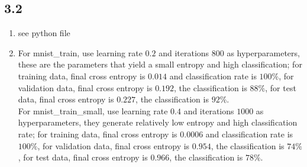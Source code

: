 \documentclass[12pt]{article}
\begin{document}
	\subsection*{3.2}
	\begin{enumerate}[label=\alph*)]
		\item see python file
		\item For mnist\_train, use learning rate $0.2$ and iterations $800$ as hyperparameters, these are the parameters that yield a small entropy and high classification; for training data, final cross entropy is $0.014$ and classification rate is $100\%$, for validation data, final cross entropy is $0.192$, the classification is $88\%$, for test data, final cross entropy is $0.227$, the classification is $92\%$.\\
		For mnist\_train\_small, use learning rate $0.4$ and iterations $1000$ as hyperparameters, they generate relatively low entropy and high classification rate;  for training data, final cross entropy is $0.0006$ and classification rate is $100\%$, for validation data, final cross entropy is $0.954$, the classification is $74\%$, for test data, final cross entropy is $0.966$, the classification is $78\%$.

\end{enumerate}
\end{document}
